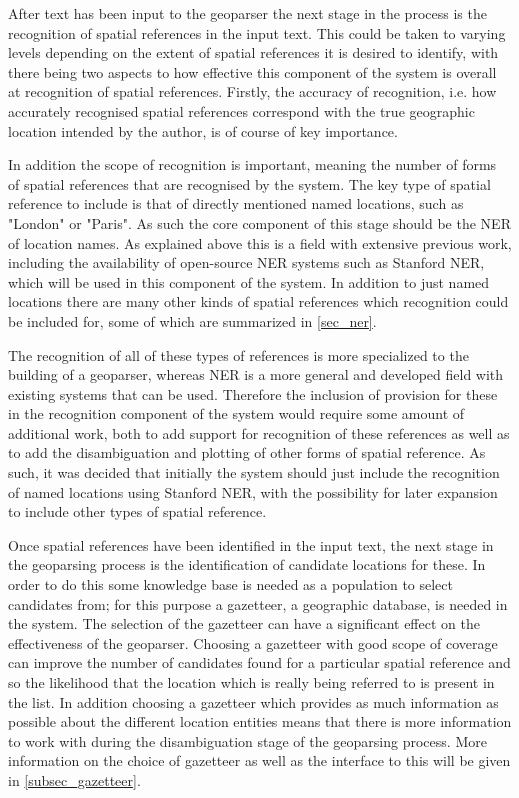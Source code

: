 \documentclass[12pt, a4paper]{report}
\begin{document}
After text has been input to the geoparser the next stage in the process is the recognition of spatial references in the input text. This could be taken to varying levels depending on the extent of spatial references it is desired to identify, with there being two aspects to how effective this component of the system is overall at recognition of spatial references. Firstly, the accuracy of recognition, i.e. how accurately recognised spatial references correspond with the true geographic location intended by the author, is of course of key importance.

In addition the scope of recognition is important, meaning the number of forms of spatial references that are recognised by the system. The key type of spatial reference to include is that of directly mentioned named locations, such as "London" or "Paris". As such the core component of this stage should be the NER of location names. As explained above this is a field with extensive previous work, including the availability of open-source NER systems such as Stanford NER, which will be used in this component of the system. In addition to just named locations there are many other kinds of spatial references which recognition could be included for, some of which are summarized in \ref{sec_ner}.

The recognition of all of these types of references is more specialized to the building of a geoparser, whereas NER is a more general and developed field with existing systems that can be used. Therefore the inclusion of provision for these in the recognition component of the system would require some amount of additional work, both to add support for recognition of these references as well as to add the disambiguation and plotting of other forms of spatial reference. As such, it was decided that initially the system should just include the recognition of named locations using Stanford NER, with the possibility for later expansion to include other types of spatial reference.

Once spatial references have been identified in the input text, the next stage in the geoparsing process is the identification of candidate locations for these. In order to do this some knowledge base is needed as a population to select candidates from; for this purpose a gazetteer, a geographic database, is needed in the system. The selection of the gazetteer can have a significant effect on the effectiveness of the geoparser. Choosing a gazetteer with good scope of coverage can improve the number of candidates found for a particular spatial reference and so the likelihood that the location which is really being referred to is present in the list. In addition choosing a gazetteer which provides as much information as possible about the different location entities means that there is more information to work with during the disambiguation stage of the geoparsing process. More information on the choice of gazetteer as well as the interface to this will be given in \ref{subsec_gazetteer}.
\end{document}
